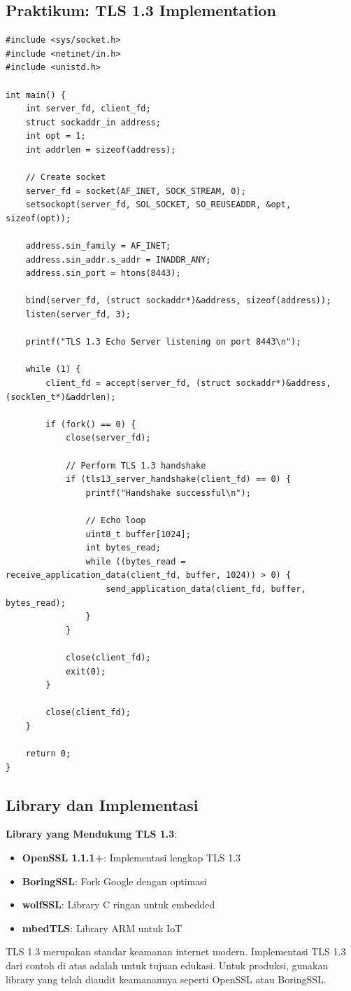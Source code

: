 \subsection{Praktikum: TLS 1.3 Implementation}

\begin{lstlisting}[style=cstyle, caption={Simple TLS 1.3 Echo Server}]
#include <sys/socket.h>
#include <netinet/in.h>
#include <unistd.h>

int main() {
    int server_fd, client_fd;
    struct sockaddr_in address;
    int opt = 1;
    int addrlen = sizeof(address);
    
    // Create socket
    server_fd = socket(AF_INET, SOCK_STREAM, 0);
    setsockopt(server_fd, SOL_SOCKET, SO_REUSEADDR, &opt, sizeof(opt));
    
    address.sin_family = AF_INET;
    address.sin_addr.s_addr = INADDR_ANY;
    address.sin_port = htons(8443);
    
    bind(server_fd, (struct sockaddr*)&address, sizeof(address));
    listen(server_fd, 3);
    
    printf("TLS 1.3 Echo Server listening on port 8443\n");
    
    while (1) {
        client_fd = accept(server_fd, (struct sockaddr*)&address, (socklen_t*)&addrlen);
        
        if (fork() == 0) {
            close(server_fd);
            
            // Perform TLS 1.3 handshake
            if (tls13_server_handshake(client_fd) == 0) {
                printf("Handshake successful\n");
                
                // Echo loop
                uint8_t buffer[1024];
                int bytes_read;
                while ((bytes_read = receive_application_data(client_fd, buffer, 1024)) > 0) {
                    send_application_data(client_fd, buffer, bytes_read);
                }
            }
            
            close(client_fd);
            exit(0);
        }
        
        close(client_fd);
    }
    
    return 0;
}
\end{lstlisting}

\subsection{Library dan Implementasi}

\textbf{Library yang Mendukung TLS 1.3}:
\begin{itemize}
  \item \textbf{OpenSSL 1.1.1+}: Implementasi lengkap TLS 1.3
  \item \textbf{BoringSSL}: Fork Google dengan optimasi
  \item \textbf{wolfSSL}: Library C ringan untuk embedded
  \item \textbf{mbedTLS}: Library ARM untuk IoT
\end{itemize}

\begin{catatan}
TLS 1.3 merupakan standar keamanan internet modern. Implementasi TLS 1.3 dari contoh di atas adalah untuk tujuan edukasi. Untuk produksi, gunakan library yang telah diaudit keamanannya seperti OpenSSL atau BoringSSL.
\end{catatan}

